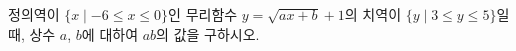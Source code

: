 정의역이 $\{x \mid -6\le x\le 0\}$인 무리함수 $y=\sqrt{ax+b}+1$의 치역이 $\{y \mid 3\le y\le 5\}$일 때, 상수 $a$, $b$에 대하여 $ab$의 값을 구하시오. 
